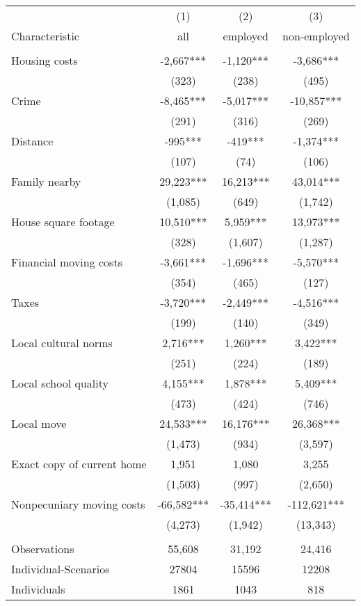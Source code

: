 \begin{tabular}{lccc} \hline
 & (1) & (2) & (3) \\
Characteristic & all & employed & non-employed \\ \hline
 &  &  &  \\
Housing costs & -2,667*** & -1,120*** & -3,686*** \\
 & (323) & (238) & (495) \\
Crime & -8,465*** & -5,017*** & -10,857*** \\
 & (291) & (316) & (269) \\
Distance & -995*** & -419*** & -1,374*** \\
 & (107) & (74) & (106) \\
Family nearby & 29,223*** & 16,213*** & 43,014*** \\
 & (1,085) & (649) & (1,742) \\
House square footage & 10,510*** & 5,959*** & 13,973*** \\
 & (328) & (1,607) & (1,287) \\
Financial moving costs & -3,661*** & -1,696*** & -5,570*** \\
 & (354) & (465) & (127) \\
Taxes & -3,720*** & -2,449*** & -4,516*** \\
 & (199) & (140) & (349) \\
Local cultural norms & 2,716*** & 1,260*** & 3,422*** \\
 & (251) & (224) & (189) \\
Local school quality & 4,155*** & 1,878*** & 5,409*** \\
 & (473) & (424) & (746) \\
Local move & 24,533*** & 16,176*** & 26,368*** \\
 & (1,473) & (934) & (3,597) \\
Exact copy of current home & 1,951 & 1,080 & 3,255 \\
 & (1,503) & (997) & (2,650) \\
Nonpecuniary moving costs & -66,582*** & -35,414*** & -112,621*** \\
 & (4,273) & (1,942) & (13,343) \\
 &  &  &  \\
Observations & 55,608 & 31,192 & 24,416 \\
Individual-Scenarios & 27804 & 15596 & 12208 \\
 Individuals & 1861 & 1043 & 818 \\ \hline
\end{tabular}
